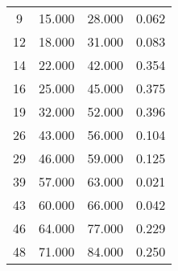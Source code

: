 % 
\begin{tabular}{cccc}
  \hline
  \hline
9 & 15.000 & 28.000 & 0.062 \\ 
  12 & 18.000 & 31.000 & 0.083 \\ 
  14 & 22.000 & 42.000 & 0.354 \\ 
  16 & 25.000 & 45.000 & 0.375 \\ 
  19 & 32.000 & 52.000 & 0.396 \\ 
  26 & 43.000 & 56.000 & 0.104 \\ 
  29 & 46.000 & 59.000 & 0.125 \\ 
  39 & 57.000 & 63.000 & 0.021 \\ 
  43 & 60.000 & 66.000 & 0.042 \\ 
  46 & 64.000 & 77.000 & 0.229 \\ 
  48 & 71.000 & 84.000 & 0.250 \\ 
   \hline
\end{tabular}
